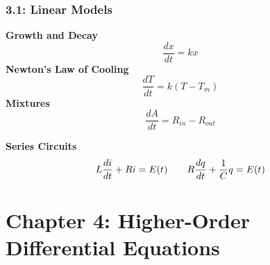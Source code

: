 \documentclass{article}
\begin{document}
\section*{3.1: Linear Models}
\begin{center}
\begin{multicols}{3}
    \textbf{Growth and Decay}
    \[\frac{dx}{dt}=kx\]
    \textbf{Newton's Law of Cooling}
    \[\frac{dT}{dt}=k(T-T_m)\]
    \textbf{Mixtures}
    \[\frac{dA}{dt}=R_{in}-R_{out}\]
\end{multicols}
\vspace{5 mm}
\textbf{Series Circuits}
\[L\frac{di}{dt}+Ri=E(t)\hspace{7 mm}R\frac{dq}{dt}+\frac{1}{C}q=E(t)\]
\end{center}
\newpage
\part*{Chapter 4: Higher-Order Differential Equations}
\end{document}
